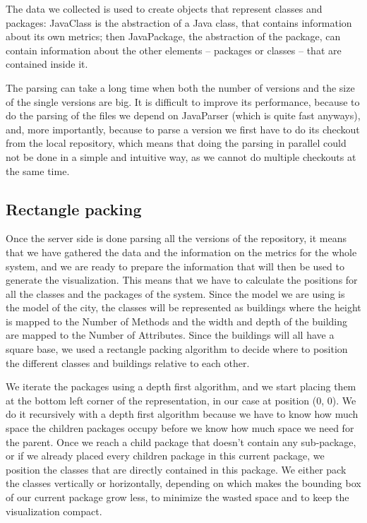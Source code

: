\documentclass[]{usiinfbachelorproject}
\begin{document}
The data we collected is used to create objects that represent classes and packages: JavaClass is the abstraction of a Java class, that contains information about its own metrics; then JavaPackage, the abstraction of the package, can contain information about the other elements -- packages or classes -- that are contained inside it.

The parsing can take a long time when both the number of versions and the size of the single versions are big.
It is difficult to improve its performance, because to do the parsing of the files we depend on JavaParser (which is quite fast anyways), and, more importantly, because to parse a version we first have to do its checkout from the local repository, which means that doing the parsing in parallel could not be done in a simple and intuitive way, as we cannot do multiple checkouts at the same time.

\subsection{Rectangle packing} \label{Rectangle packing}
Once the server side is done parsing all the versions of the repository, it means that we have gathered the data and the information on the metrics for the whole system, and we are ready to prepare the information that will then be used to generate the visualization. This means that we have to calculate the positions for all the classes and the packages of the system. Since the model we are using is the model of the city, the classes will be represented as buildings where the height is mapped to the Number of Methods and the width and depth of the building are mapped to the Number of Attributes. Since the buildings will all have a square base, we used a rectangle packing algorithm \cite{yuriyBlog} to decide where to position the different classes and buildings relative to each other.

We iterate the packages using a depth first algorithm, and we start placing them at the bottom left corner of the representation, in our case at position (0, 0). We do it recursively with a depth first algorithm because we have to know how much space the children packages occupy before we know how much space we need for the parent.
Once we reach a child package that doesn't contain any sub-package, or if we already placed every children package in this current package, we position the classes that are directly contained in this package. We either pack the classes vertically or horizontally, depending on which makes the bounding box of our current package grow less, to minimize the wasted space and to keep the visualization compact.
\end{document}
